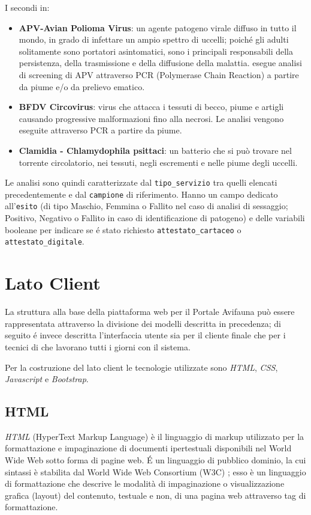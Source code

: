 I secondi in:
\begin{itemize}
 \item \textbf{APV-Avian Polioma Virus}: un agente patogeno virale diffuso in tutto il mondo, in grado di infettare un ampio spettro di uccelli; poiché gli adulti solitamente sono portatori asintomatici, sono i principali responsabili della persistenza, della trasmissione e della diffusione della malattia. {\fem} esegue analisi di screening di APV attraverso PCR (Polymerase Chain Reaction) a partire da piume e/o da prelievo ematico.
 \item \textbf{BFDV Circovirus}: virus che attacca i tessuti di becco, piume e artigli causando progressive malformazioni fino alla necrosi. Le analisi vengono eseguite attraverso PCR a partire da piume.
 \item \textbf{Clamidia - Chlamydophila psittaci}: un batterio che si può trovare nel torrente circolatorio, nei tessuti, negli escrementi e nelle piume degli uccelli.
\end{itemize}

Le analisi sono quindi caratterizzate dal \texttt{tipo\_servizio} tra quelli elencati precedentemente e dal \texttt{campione} di riferimento. Hanno un campo dedicato all'\texttt{esito} (di tipo Maschio, Femmina o Fallito nel caso di analisi di sessaggio; Positivo, Negativo o Fallito in caso di identificazione di patogeno) e delle variabili booleane per indicare se é stato richiesto \texttt{attestato\_cartaceo} o \texttt{attestato\_digitale}.

\newpage
\section{Lato Client}
\label{sec:client}
La struttura alla base della piattaforma web per il Portale Avifauna può essere rappresentata attraverso la divisione dei modelli descritta in precedenza; di seguito é invece descritta l'interfaccia utente sia per il cliente finale che per i tecnici di {\fem} che lavorano tutti i giorni con il sistema.

Per la costruzione del lato client le tecnologie utilizzate sono \emph{HTML}, \emph{CSS}, \emph{Javascript} e \emph{Bootstrap}.

\subsection{HTML}
\label{subs:html}
\emph{HTML} (HyperText Markup Language) è il linguaggio di markup utilizzato per la formattazione e impaginazione di documenti ipertestuali disponibili nel World Wide Web sotto forma di pagine web. É un linguaggio di pubblico dominio, la cui sintassi è stabilita dal World Wide Web Consortium (W3C) \cite{html}; esso è un linguaggio di formattazione che descrive le modalità di impaginazione o visualizzazione grafica (layout) del contenuto, testuale e non, di una pagina web attraverso tag di formattazione.


